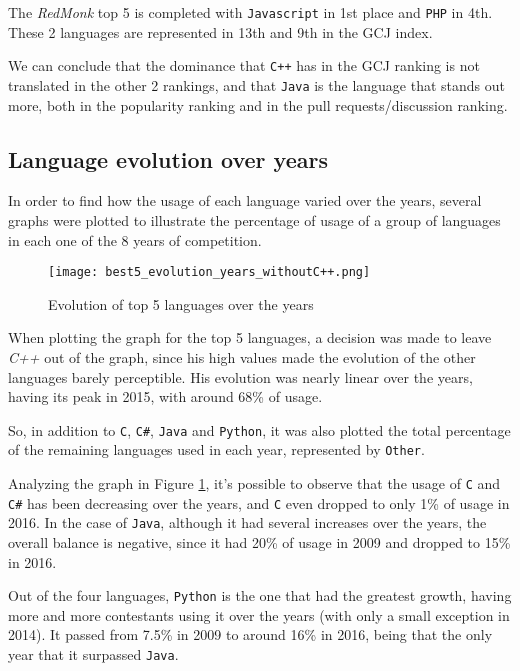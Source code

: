 \documentclass{article}
\begin{document}
\begin{multicols*}{2}
The \textit{RedMonk} top 5 is completed with \texttt{Javascript} in 1st place and \texttt{PHP} in 4th. These 2 languages are represented in 13th and 9th in the GCJ index.

We can conclude that the dominance that \texttt{C++} has in the GCJ ranking is not translated in the other 2 rankings, and that \texttt{Java} is the language that stands out more, both in the popularity ranking and in the pull requests/discussion ranking.


\subsection{Language evolution over years}

In order to find how the usage of each language varied over the years, several graphs were plotted to illustrate the percentage of usage of a group of languages in each one of the 8 years of competition.

\begin{figure}[H]
    \centering
    \texttt{[image: best5\_evolution\_years\_withoutC++.png]}
    \caption{Evolution of top 5 languages over the years}
    \label{fig:top5_evo}
\end{figure}

When plotting the graph for the top 5 languages, a decision was made to leave \textit{C++} out of the graph, since his high values made the evolution of the other languages barely perceptible. His evolution was nearly linear over the years, having its peak in 2015, with around 68\% of usage.

So, in addition to \texttt{C}, \texttt{C\#}, \texttt{Java} and \texttt{Python}, it was also plotted the total percentage of the remaining languages used in each year, represented by \texttt{Other}.


Analyzing the graph in Figure \ref{fig:top5_evo}, it's possible to observe that the usage of \texttt{C} and \texttt{C\#} has been decreasing over the years, and \texttt{C} even dropped to only 1\% of usage in 2016.
In the case of \texttt{Java}, although it had several increases over the years, the overall balance is negative, since it had 20\% of usage in 2009 and dropped to 15\% in 2016.

Out of the four languages, \texttt{Python} is the one that had the greatest growth, having more and more contestants using it over the years (with only a small exception in 2014). It passed from 7.5\% in 2009 to around 16\% in 2016, being that the only year that it surpassed \texttt{Java}.


\end{multicols*}
\end{document}
